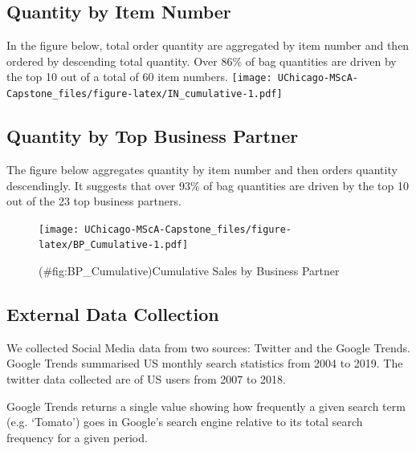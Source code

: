 \documentclass[12pt,oneside]{chicagocapstone}
\begin{document}
\subsection{Quantity by Item Number}\label{quantity-by-item-number}

In the figure below, total order quantity are aggregated by item number
and then ordered by descending total quantity. Over 86\% of bag
quantities are driven by the top 10 out of a total of 60 item numbers.
\texttt{[image: UChicago-MScA-Capstone\_files/figure-latex/IN\_cumulative-1.pdf]}

\subsection{Quantity by Top Business
Partner}\label{quantity-by-top-business-partner}

The figure below aggregates quantity by item number and then orders
quantity descendingly. It suggests that over 93\% of bag quantities are
driven by the top 10 out of the 23 top business partners.
\begin{figure}
\centering
\texttt{[image: UChicago-MScA-Capstone\_files/figure-latex/BP\_Cumulative-1.pdf]}
\caption{(\#fig:BP\_Cumulative)Cumulative Sales by Business Partner}
\end{figure}
\subsection{External Data Collection}\label{external-data-collection}

We collected Social Media data from two sources: Twitter and the Google
Trends. Google Trends summarised US monthly search statistics from 2004
to 2019. The twitter data collected are of US users from 2007 to 2018.

Google Trends returns a single value showing how frequently a given
search term (e.g. `Tomato') goes in Google's search engine relative to
its total search frequency for a given period.
\end{document}
